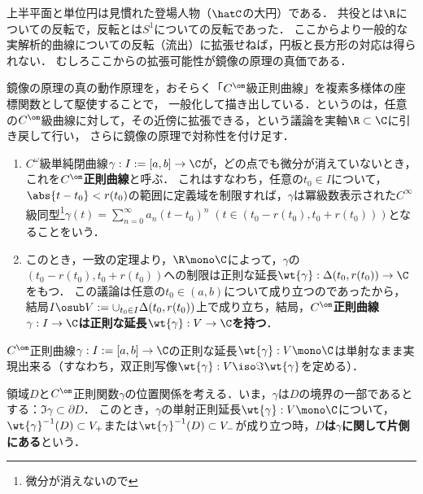 \documentclass[uplatex, dvipdfmx]{jsreport}
\begin{document}
\begin{tcolorbox}[colframe=ForestGreen, colback=ForestGreen!10!white,breakable,colbacktitle=ForestGreen!40!white,coltitle=black,fonttitle=\bfseries\sffamily,
title=定義域の境界に実解析的な部分があれば，そこから浸透して関数を正則に延長できる]
    上半平面と単位円は見慣れた登場人物（$\hatC$の大円）である．
    共役とは$\R$についての反転で，反転とは$S^1$についての反転であった．
    ここからより一般的な実解析的曲線についての反転（流出）に拡張せねば，円板と長方形の対応は得られない．
    むしろここからの拡張可能性が鏡像の原理の真価である．

    鏡像の原理の真の動作原理を，おそらく「$C^\om$級正則曲線」を複素多様体の座標関数として駆使することで，
    一般化して描き出している．というのは，任意の$C^\om$級曲線に対して，その近傍に拡張できる，という議論を実軸$\R\subset\C$に引き戻して行い，
    さらに鏡像の原理で対称性を付け足す．
\end{tcolorbox}

\begin{definition}\mbox{}
    \begin{enumerate}
        \item $C^\omega$級単純閉曲線$\gamma:I:=[a,b]\to\C$が，どの点でも微分が消えていないとき，これを\textbf{$C^\om$正則曲線}と呼ぶ．
        これはすなわち，任意の$t_0\in I$について，$\abs{t-t_0}<r(t_0)$の範囲に定義域を制限すれば，$\gamma$は冪級数表示された$C^\infty$級同型\footnote{微分が消えないので}$\gamma(t)=\sum^\infty_{n=0}a_n(t-t_0)^n\;(t\in(t_0-r(t_0),t_0+r(t_0)))$となることをいう．
        \item このとき，一致の定理より，$\R\mono\C$によって，$\gamma$の$(t_0-r(t_0),t_0+r(t_0))$への制限は正則な延長$\wt{\gamma}:\Delta(t_0,r(t_0))\to\C$をもつ．
        この議論は任意の$t_0\in(a,b)$について成り立つのであったから，結局$I\osub V:=\cup_{t_0\in I}\Delta(t_0,r(t_0))$上で成り立ち，結局，\textbf{$C^\om$正則曲線$\gamma:I\to\C$は正則な延長$\wt{\gamma}:V\to\C$を持つ}．
    \end{enumerate}
\end{definition}

\begin{lemma}
    $C^\om$正則曲線$\gamma:I:=[a,b]\to\C$の正則な延長$\wt{\gamma}:V\mono\C$は単射なまま実現出来る（すなわち，双正則写像$\wt{\gamma}:V\iso\Im\wt{\gamma}$を定める）．
\end{lemma}

\begin{definition}[片側にある領域]
    領域$D$と$C^\om$正則関数$\gamma$の位置関係を考える．いま，$\gamma$は$D$の境界の一部であるとする：$\Im\gamma\subset\partial D$．
    このとき，$\gamma$の単射正則延長$\wt{\gamma}:V\mono\C$について，
    $\wt{\gamma}^{-1}(D)\subset V_+$または$\wt{\gamma}^{-1}(D)\subset V_-$が成り立つ時，\textbf{$D$は$\gamma$に関して片側にある}という．
\end{definition}
\end{document}
